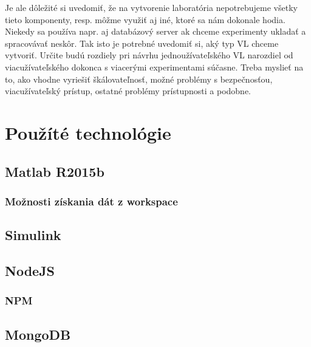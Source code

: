 Je ale dôležité si uvedomiť, že na vytvorenie laboratória nepotrebujeme všetky tieto komponenty, resp. môžme využiť aj iné, ktoré sa nám dokonale hodia. Niekedy sa používa napr. aj databázový server ak chceme experimenty ukladať a spracovávať neskôr. Tak isto je potrebné uvedomiť si, aký typ VL chceme vytvoriť. Určite budú rozdiely pri návrhu jednoužívateľského VL narozdiel od viacužívateľského dokonca s viacerými experimentami súčasne. Treba myslieť na to, ako vhodne vyriešiť škálovateľnosť, možné problémy s bezpečnosťou, viacužívateľský prístup, ostatné problémy prístupnosti a podobne.







\section{Použíté technológie}\label{used-technologies}

\subsection{Matlab R2015b}
\subsubsection{Možnosti získania dát z workspace}
\subsection{Simulink}

\subsection{NodeJS}
\subsubsection{NPM}
\subsection{MongoDB}


